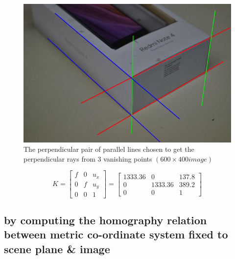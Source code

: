 \documentclass[fleqn]{article}
\begin{document}
\begin{itemize}
\clearpage
\begin{figure}[!ht]
\centering
\includegraphics[scale=0.4]{./pics/img2_ink}
\caption{The perpendicular pair of parallel lines chosen to get the perpendicular rays from 3 vanishing points $(600 \times 400 image)$}
\end{figure}
\[
 K = \begin{bmatrix}
   		f & 0 & u_x \\
   		0 & f & u_y \\
   		0 & 0 & 1
   \end{bmatrix}
=    \begin{bmatrix}
   		1333.36 & 0 & 137.8 \\
   		0 & 1333.36 & 389.2 \\
   		0 & 0 & 1
   \end{bmatrix}
\]
\end{itemize}

\subsection{by computing the homography relation between metric co-ordinate system fixed to scene plane \& image}
\end{document}
